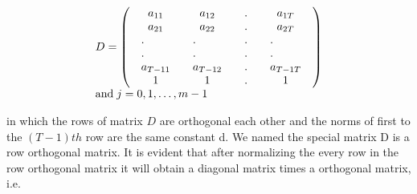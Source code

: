\documentclass[preprint,authoryear,12pt]{elsarticle}
\begin{document}
$$
\begin{array}{l}
 D = \left( {\begin{array}{*{20}c}
   {a_{11} } & {a_{12} } & . & {a_{1T} }  \\
   {a_{21} } & {a_{22} } & . & {a_{2T} }  \\
   \begin{array}{l}
 . \\
 . \\
 a_{T - 11}  \\
 \end{array} & \begin{array}{l}
 . \\
 . \\
 a_{T - 12}  \\
 \end{array} & \begin{array}{l}
 . \\
 . \\
 . \\
 \end{array} & \begin{array}{l}
 . \\
 . \\
 a_{T - 1T}  \\
 \end{array}  \\
   1 & 1 & . & 1  \\
\end{array}} \right) \\
 {\rm{and}}\;j = 0,1, \ldots ,m - 1 \\
 \end{array}
$$

in which the rows of matrix $D$ are orthogonal each other and the norms of  first to the $(T-1)th$ row are the same constant d. We named the special matrix D is a row orthogonal matrix. It is evident that after normalizing the every row in the row orthogonal matrix it will obtain a diagonal matrix times a orthogonal matrix, i.e.
\end{document}
